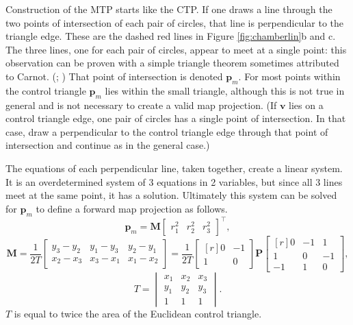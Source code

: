 \documentclass[]{interact}
\begin{document}
Construction of the MTP starts like the CTP. If one draws a line through the two
points of intersection of each pair of circles, that line is perpendicular to
the triangle edge. These are the dashed red lines in Figure
\ref{fig:chamberlin}b and c. The three lines, one for each pair of circles,
appear to meet at a single point: this observation can be proven with a simple
triangle theorem sometimes attributed to Carnot. (\citealp{posamentier};
\citealp{wohlgemuth}) That point of intersection is denoted $\mathbf p_m$. For
most points within the control triangle $\mathbf p_m$ lies within the small
triangle, although this is not true in general and is not necessary to create a
valid map projection. (If $\mathbf v$ lies on a control triangle edge,
one pair of circles has a single point of intersection. In that case,
draw a perpendicular to the control triangle edge through that
point of intersection and continue as in the general case.)

The equations of each perpendicular line, taken together, create a linear
system. It is an overdetermined system of 3 equations in 2 variables, but since
all 3 lines meet at the same point, it has a solution. Ultimately this system
can be solved for $\mathbf p_m$ to define a forward map projection as follows.
\begin{equation}\label{eq:forward}
\mathbf p_m =
\mathbf M \begin{bmatrix*} r^2_1 & r^2_2 & r^2_3 \end{bmatrix*}^\top,
\end{equation}
\begin{equation}\label{eq:forwardm}
\mathbf M = \frac{1}{2T}
\begin{bmatrix*} y_3 - y_2 & y_1 - y_3 & y_2 - y_1 \\
x_2 - x_3 & x_3 - x_1 & x_1 - x_2 \end{bmatrix*} = \frac{1}{2T}
\begin{bmatrix*}[r] 0 & -1  \\
1 & 0 \end{bmatrix*}
\mathbf P
\begin{bmatrix*}[r] 0 & -1 & 1 \\
1 & 0 & -1 \\
-1 & 1 & 0 \end{bmatrix*},
\end{equation}
\begin{equation}\label{eq:forwardt}
T = \begin{vmatrix*} x_1 & x_2 & x_3 \\
 y_1 & y_2 & y_3 \\
 1 & 1 & 1
\end{vmatrix*}.
\end{equation}
$T$ is equal to twice the area of the Euclidean control triangle.
\end{document}
